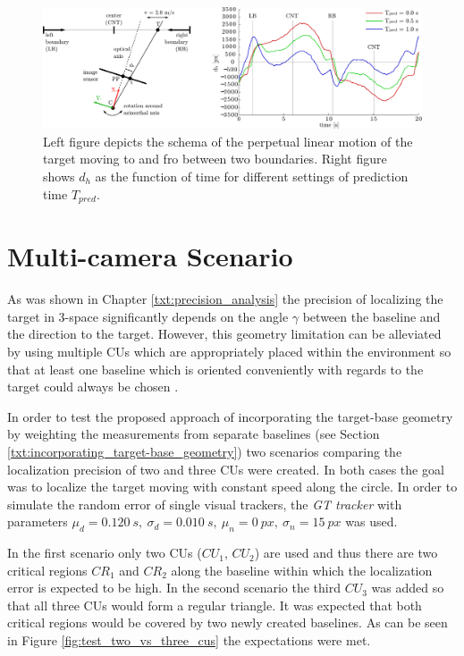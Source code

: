 \begin{figure}[htb]\centering
	\centering
	\includegraphics[width=0.95\linewidth]{fig/schema_defile_and_motion_prediction.pdf}
	\caption{Left figure depicts the schema of the perpetual linear motion of the target moving to and fro between two boundaries. Right figure shows $d_{h}$ as the function of time for different settings of prediction time $T_{pred}$.}
	\label{fig:test_motion_predict}
\end{figure}

\section{Multi-camera Scenario} \label{txt:multi-camera_scenario}

As was shown in Chapter \ref{txt:precision_analysis} the precision of localizing the target in 3-space significantly depends on the angle $\gamma$ between the baseline and the direction to the target. However, this geometry limitation can be alleviated by using multiple CUs which are appropriately placed within the environment so that at least one baseline which is oriented conveniently with regards to the target could always be chosen .

In order to test the proposed approach of incorporating the target-base geometry by weighting the measurements from separate baselines (see Section \ref{txt:incorporating_target-base_geometry}) two scenarios comparing the localization precision of two and three CUs were created. In both cases the goal was to localize the target moving with constant speed along the circle. In order to simulate the random error of single visual trackers, the \textit{GT tracker} with parameters $\mu_{d} = 0.120~s,~\sigma_{d} = 0.010~s,~\mu_{n} = 0~px,~\sigma_{n} = 15~px$ was used. 

In the first scenario only two CUs ($CU_{1}$, $CU_{2}$) are used and thus there are two critical regions $CR_{1}$ and $CR_{2}$ along the baseline within which the localization error is expected to be high. In the second scenario the third $CU_{3}$ was added so that all three CUs would form a regular triangle. It was expected that both critical regions would be covered by two newly created baselines. As can be seen in Figure \ref{fig:test_two_vs_three_cus} the expectations were met.

